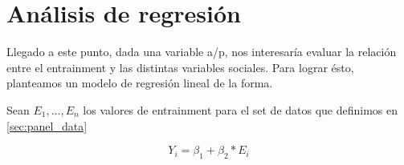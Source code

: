 \section{Análisis de regresión}

Llegado a este punto, dada una variable a/p, nos interesaría evaluar la relación entre el entrainment y las distintas variables sociales. Para lograr ésto, planteamos un modelo de regresión lineal de la forma.

Sean $E_1, \ldots, E_n$ los valores de entrainment para el set de datos que definimos en \ref{sec:panel_data}

\begin{equation*}
Y_i = \beta_1 + \beta_2 * E_i
\end{equation*}
